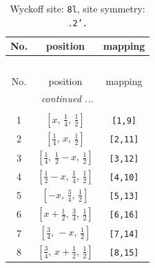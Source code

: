 \documentclass[fleqn,8pt]{jsarticle}
\begin{document}
\begin{longtable}{ccc}
\caption{Wyckoff site: {\tt 8l}, site symmetry: {\tt .2'.}}
 \\
 \hline \hline
No. & position & mapping \\ \hline \endfirsthead

\multicolumn{2}{l}{\tablename\ \thetable{}} \\
 \hline \hline
No. & position & mapping \\ \hline \endhead

 \hline \hline
\multicolumn{2}{r}{\footnotesize\it continued ...} \\ \endfoot

 \hline \hline
\multicolumn{2}{r}{} \\ \endlastfoot

1 & $\left[ x,\, \frac{1}{4},\, \frac{1}{2} \right]$ & {\tt [1,9]} \\ \hline
2 & $\left[ \frac{1}{4},\, x,\, \frac{1}{2} \right]$ & {\tt [2,11]} \\ \hline
3 & $\left[ \frac{1}{4},\, \frac{1}{2} - x,\, \frac{1}{2} \right]$ & {\tt [3,12]} \\ \hline
4 & $\left[ \frac{1}{2} - x,\, \frac{1}{4},\, \frac{1}{2} \right]$ & {\tt [4,10]} \\ \hline
5 & $\left[ - x,\, \frac{3}{4},\, \frac{1}{2} \right]$ & {\tt [5,13]} \\ \hline
6 & $\left[ x + \frac{1}{2},\, \frac{3}{4},\, \frac{1}{2} \right]$ & {\tt [6,16]} \\ \hline
7 & $\left[ \frac{3}{4},\, - x,\, \frac{1}{2} \right]$ & {\tt [7,14]} \\ \hline
8 & $\left[ \frac{3}{4},\, x + \frac{1}{2},\, \frac{1}{2} \right]$ & {\tt [8,15]} \\
\end{longtable}
\renewcommand{\arraystretch}{1.2}
\end{document}
